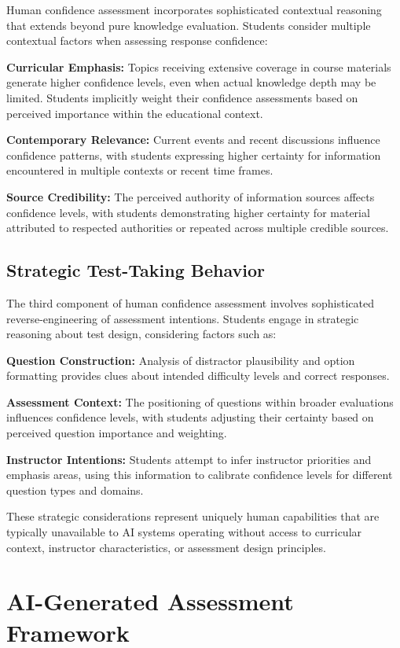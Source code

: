 \documentclass[sigconf]{acmart}
\begin{document}
Human confidence assessment incorporates sophisticated contextual reasoning that extends beyond pure knowledge evaluation. Students consider multiple contextual factors when assessing response confidence:

\textbf{Curricular Emphasis:} Topics receiving extensive coverage in course materials generate higher confidence levels, even when actual knowledge depth may be limited. Students implicitly weight their confidence assessments based on perceived importance within the educational context.

\textbf{Contemporary Relevance:} Current events and recent discussions influence confidence patterns, with students expressing higher certainty for information encountered in multiple contexts or recent time frames.

\textbf{Source Credibility:} The perceived authority of information sources affects confidence levels, with students demonstrating higher certainty for material attributed to respected authorities or repeated across multiple credible sources.

\subsection{Strategic Test-Taking Behavior}

The third component of human confidence assessment involves sophisticated reverse-engineering of assessment intentions. Students engage in strategic reasoning about test design, considering factors such as:

\textbf{Question Construction:} Analysis of distractor plausibility and option formatting provides clues about intended difficulty levels and correct responses.

\textbf{Assessment Context:} The positioning of questions within broader evaluations influences confidence levels, with students adjusting their certainty based on perceived question importance and weighting.

\textbf{Instructor Intentions:} Students attempt to infer instructor priorities and emphasis areas, using this information to calibrate confidence levels for different question types and domains.

These strategic considerations represent uniquely human capabilities that are typically unavailable to AI systems operating without access to curricular context, instructor characteristics, or assessment design principles.

\section{AI-Generated Assessment Framework}
\end{document}
